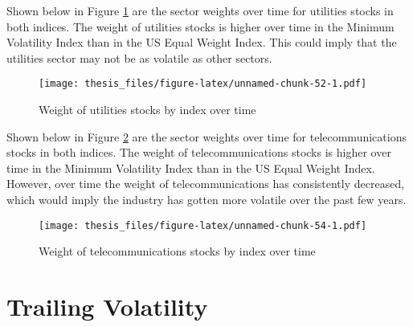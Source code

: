 \documentclass[12pt,twoside]{reedthesis}
\theoremstyle{definition}
\theoremstyle{definition}
\theoremstyle{definition}
\theoremstyle{remark}
\begin{document}
Shown below in Figure \ref{fig:sector9} are the sector weights over time
for utilities stocks in both indices. The weight of utilities stocks is
higher over time in the Minimum Volatility Index than in the US Equal
Weight Index. This could imply that the utilities sector may not be as
volatile as other sectors.
\begin{figure}[htbp]
\centering
\texttt{[image: thesis\_files/figure-latex/unnamed-chunk-52-1.pdf]}
\caption{\label{fig:unnamed-chunk-52}Weight of utilities stocks by index
over time\label{fig:sector9}}
\end{figure}
\clearpage
Shown below in Figure \ref{fig:sector10} are the sector weights over
time for telecommunications stocks in both indices. The weight of
telecommunications stocks is higher over time in the Minimum Volatility
Index than in the US Equal Weight Index. However, over time the weight
of telecommunications has consistently decreased, which would imply the
industry has gotten more volatile over the past few years.
\begin{figure}[htbp]
\centering
\texttt{[image: thesis\_files/figure-latex/unnamed-chunk-54-1.pdf]}
\caption{\label{fig:unnamed-chunk-54}Weight of telecommunications stocks by
index over time\label{fig:sector10}}
\end{figure}
\clearpage 

\section{Trailing Volatility}\label{trailing-volatility}
\end{document}
